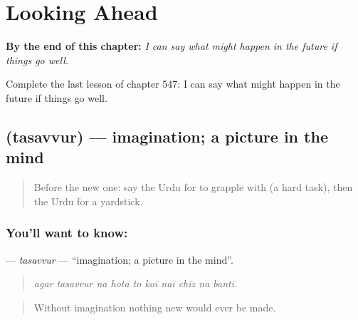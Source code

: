 
\chapter{Looking Ahead}
\label{ch:ur-looking-ahead}

\begin{chapteropening}
\textbf{By the end of this chapter:} \emph{I can say what might happen in the future if things go well.}

Complete the last lesson of chapter 547: I can say what might happen in the future if things go well.
\end{chapteropening}

\section[\texorpdfstring{\ur{تصور} (tasavvur)}{تصور (tasavvur)}]{ (tasavvur) — imagination; a picture in the mind}

\label{lesson:UR-C547-tasavvur}



\begin{quote}
Before the new one: say the Urdu for to grapple with (a hard task), then the Urdu for a yardstick.
\end{quote}

\subsection*{You'll want to know: }
\textbf{} — \emph{tasavvur} — \textquotedblleft{}imagination; a picture in the mind\textquotedblright{}.

\begin{quote}
         
\end{quote}

\begin{quote}
\emph{agar tasavvur na hotā to koī naī chīz na bantī.}
\end{quote}

\begin{quote}
Without imagination nothing new would ever be made.
\end{quote}

